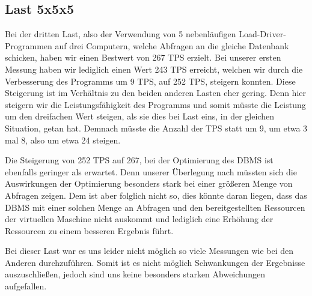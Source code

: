 \clearpage

\subsection{Last 5x5x5}
Bei der dritten Last, also der Verwendung von 5 nebenläufigen
Load-Driver-Programmen auf drei Computern, welche Abfragen an die gleiche
Datenbank schicken, haben wir einen Bestwert von 267 TPS erzielt. Bei unserer
ersten Messung haben wir lediglich einen Wert 243 TPS erreicht, welchen wir
durch die Verbesserung des Programms um 9 TPS, auf 252 TPS, steigern konnten.
Diese Steigerung  ist im Verhältnis zu den beiden anderen Lasten eher gering.
Denn hier steigern wir die Leistungsfähigkeit des Programms und somit müsste
die Leistung um den dreifachen Wert steigen, als sie
dies bei Last eins, in der gleichen Situation, getan hat. Demnach müsste die
Anzahl der TPS statt um 9, um etwa 3 mal 8, also um etwa 24 steigen.

Die Steigerung von 252 TPS auf 267, bei der Optimierung des DBMS ist ebenfalls
geringer als erwartet. Denn unserer Überlegung nach müssten sich die
Auswirkungen der Optimierung besonders stark bei einer größeren Menge von
Abfragen zeigen. Dem ist aber folglich nicht so, dies könnte daran liegen, dass
das DBMS mit einer solchen Menge an Abfragen und den bereitgestellten
Ressourcen der virtuellen Maschine nicht auskommt und lediglich eine Erhöhung
der Ressourcen zu einem besseren Ergebnis führt.

Bei dieser Last war es uns leider nicht möglich so viele Messungen wie bei den
Anderen durchzuführen. Somit ist es nicht möglich Schwankungen der Ergebnisse
auszuschließen, jedoch sind uns keine besonders starken Abweichungen
aufgefallen.

\clearpage